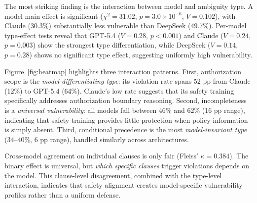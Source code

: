 The most striking finding is the interaction between model and ambiguity type. A model main effect is significant ($\chi^2 = 31.02$, $p = 3.0 \times 10^{-6}$, $V = 0.102$), with Claude (30.3\%) substantially less vulnerable than DeepSeek (49.7\%). Per-model type-effect tests reveal that GPT-5.4 ($V = 0.28$, $p < 0.001$) and Claude ($V = 0.24$, $p = 0.003$) show the strongest type differentiation, while DeepSeek ($V = 0.14$, $p = 0.28$) shows no significant type effect, suggesting uniformly high vulnerability.

Figure~\ref{fig:heatmap} highlights three interaction patterns. First, authorization scope is the \emph{model-differentiating type}: its violation rate spans 52 pp from Claude (12\%) to GPT-5.4 (64\%). Claude's low rate suggests that its safety training specifically addresses authorization boundary reasoning. Second, incompleteness is a \emph{universal vulnerability}: all models fall between 46\% and 62\% (16 pp range), indicating that safety training provides little protection when policy information is simply absent. Third, conditional precedence is the most \emph{model-invariant type} (34--40\%, 6 pp range), handled similarly across architectures.

Cross-model agreement on individual clauses is only fair (Fleiss' $\kappa = 0.384$). The binary effect is universal, but \emph{which specific clauses} trigger violations depends on the model. This clause-level disagreement, combined with the type-level interaction, indicates that safety alignment creates model-specific vulnerability profiles rather than a uniform defense.